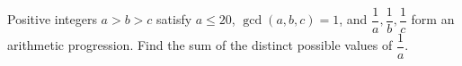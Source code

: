 Positive integers $a>b>c$ satisfy $a\le20$, $\gcd(a,b,c)=1$, and $\dfrac{1}{a},\dfrac{1}{b},\dfrac{1}{c}$ form an arithmetic progression. Find the sum of the distinct possible values of $\dfrac{1}{a}$.
